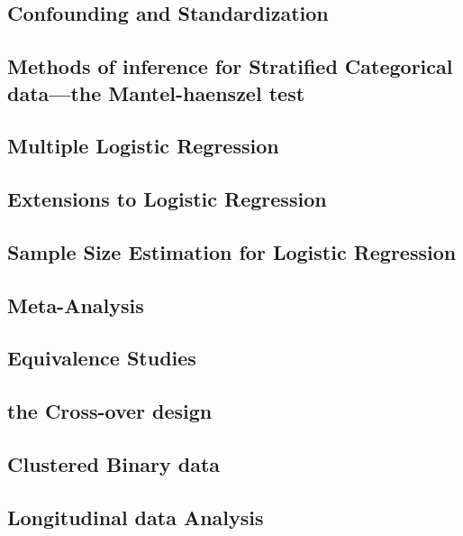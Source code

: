 \documentclass[12pt,]{article}
\theoremstyle{definition}
\theoremstyle{definition}
\theoremstyle{definition}
\theoremstyle{remark}
\begin{document}
\subsection{Confounding and
Standardization}\label{confounding-and-standardization}

\subsection{Methods of inference for Stratified Categorical data---the
Mantel-haenszel
test}\label{methods-of-inference-for-stratified-categorical-datathe-mantel-haenszel-test}

\subsection{Multiple Logistic
Regression}\label{multiple-logistic-regression}

\subsection{Extensions to Logistic
Regression}\label{extensions-to-logistic-regression}

\subsection{Sample Size Estimation for Logistic
Regression}\label{sample-size-estimation-for-logistic-regression}

\subsection{Meta-Analysis}\label{meta-analysis}

\subsection{Equivalence Studies}\label{equivalence-studies}

\subsection{the Cross-over design}\label{the-cross-over-design}

\subsection{Clustered Binary data}\label{clustered-binary-data}

\subsection{Longitudinal data
Analysis}\label{longitudinal-data-analysis}
\end{document}
